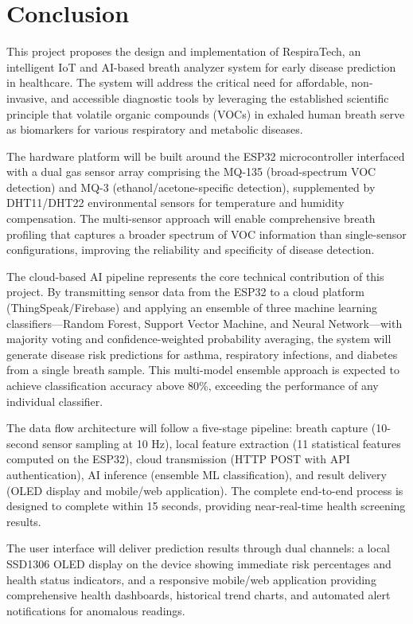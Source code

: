\chapter{Conclusion}

This project proposes the design and implementation of RespiraTech, an intelligent IoT and AI-based breath analyzer system for early disease prediction in healthcare. The system will address the critical need for affordable, non-invasive, and accessible diagnostic tools by leveraging the established scientific principle that volatile organic compounds (VOCs) in exhaled human breath serve as biomarkers for various respiratory and metabolic diseases.

The hardware platform will be built around the ESP32 microcontroller interfaced with a dual gas sensor array comprising the MQ-135 (broad-spectrum VOC detection) and MQ-3 (ethanol/acetone-specific detection), supplemented by DHT11/DHT22 environmental sensors for temperature and humidity compensation. The multi-sensor approach will enable comprehensive breath profiling that captures a broader spectrum of VOC information than single-sensor configurations, improving the reliability and specificity of disease detection.

The cloud-based AI pipeline represents the core technical contribution of this project. By transmitting sensor data from the ESP32 to a cloud platform (ThingSpeak/Firebase) and applying an ensemble of three machine learning classifiers---Random Forest, Support Vector Machine, and Neural Network---with majority voting and confidence-weighted probability averaging, the system will generate disease risk predictions for asthma, respiratory infections, and diabetes from a single breath sample. This multi-model ensemble approach is expected to achieve classification accuracy above 80\%, exceeding the performance of any individual classifier.

The data flow architecture will follow a five-stage pipeline: breath capture (10-second sensor sampling at 10 Hz), local feature extraction (11 statistical features computed on the ESP32), cloud transmission (HTTP POST with API authentication), AI inference (ensemble ML classification), and result delivery (OLED display and mobile/web application). The complete end-to-end process is designed to complete within 15 seconds, providing near-real-time health screening results.

The user interface will deliver prediction results through dual channels: a local SSD1306 OLED display on the device showing immediate risk percentages and health status indicators, and a responsive mobile/web application providing comprehensive health dashboards, historical trend charts, and automated alert notifications for anomalous readings.

